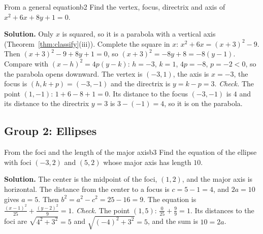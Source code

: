 \documentclass[11pt]{article}
\begin{document}
\begin{exmp}{From a general equation}{b2}
Find the vertex, focus, directrix and axis of $x^2+6x+8y+1=0$.

\textbf{Solution.} Only $x$ is squared, so it is a parabola with a vertical axis (Theorem~\ref{thm:classify}(iii)). Complete the square in $x$: $x^2+6x=(x+3)^2-9$. Then $(x+3)^2-9+8y+1=0$, so $(x+3)^2=-8y+8=-8(y-1)$. Compare with $(x-h)^2=4p(y-k)$: $h=-3$, $k=1$, $4p=-8$, $p=-2<0$, so the parabola opens downward. The vertex is $(-3,1)$, the axis is $x=-3$, the focus is $(h,k+p)=(-3,-1)$ and the directrix is $y=k-p=3$.
\emph{Check.} The point $(1,-1)$: $1+6-8+1=0$. Its distance to the focus $(-3,-1)$ is $4$ and its distance to the directrix $y=3$ is $3-(-1)=4$, so it is on the parabola.
\end{exmp}

\subsection*{Group 2: Ellipses}

\begin{exmp}{From the foci and the length of the major axis}{b3}
Find the equation of the ellipse with foci $(-3,2)$ and $(5,2)$ whose major axis has length $10$.

\textbf{Solution.} The center is the midpoint of the foci, $(1,2)$, and the major axis is horizontal. The distance from the center to a focus is $c=5-1=4$, and $2a=10$ gives $a=5$. Then $b^2=a^2-c^2=25-16=9$. The equation is $\frac{(x-1)^2}{25}+\frac{(y-2)^2}{9}=1$.
\emph{Check.} The point $(1,5)$: $\frac{0}{25}+\frac99=1$. Its distances to the foci are $\sqrt{4^2+3^2}=5$ and $\sqrt{(-4)^2+3^2}=5$, and the sum is $10=2a$.
\end{exmp}
\end{document}
